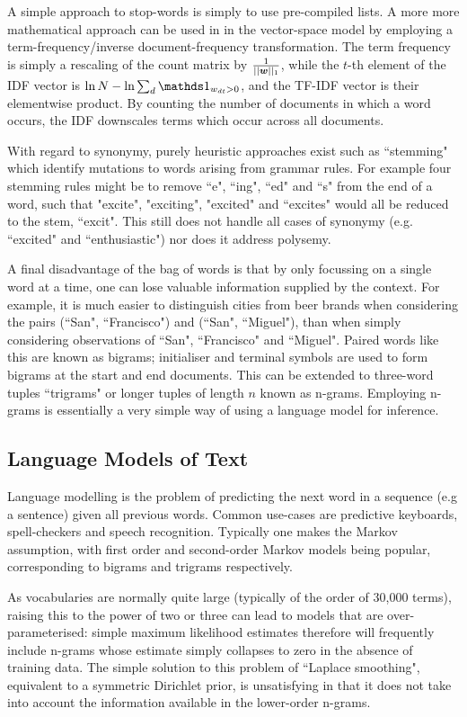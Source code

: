 A simple approach to stop-words is simply to use pre-compiled lists. A more more mathematical approach can be used in in the vector-space model by employing a term-frequency/inverse document-frequency transformation. The term frequency is simply a rescaling of the count matrix by $\frac{1}{||\bm w||_1}$, while the $t$-th element of the IDF vector is $\ln N - \ln \sum_d \one_{w_{dt} > 0}$, and the TF-IDF vector is their elementwise product. By counting the number of documents in which a word occurs, the IDF downscales terms which occur across all documents. 

With regard to synonymy, purely heuristic approaches exist such as ``stemming" which identify mutations to words arising from grammar rules. For example four stemming rules might be to remove ``e", ``ing", ``ed" and ``s" from the end of a word, such that "excite", "exciting", "excited" and ``excites" would all be reduced to the stem, ``excit". This still does not handle all cases of synonymy (e.g. ``excited" and ``enthusiastic") nor does it address polysemy.

A final disadvantage of the bag of words is that by only focussing on a single word at a time, one can lose valuable information supplied by the context. For example, it is much easier to distinguish cities from beer brands when considering the pairs (``San", ``Francisco") and (``San", ``Miguel"), than when simply considering observations of ``San", ``Francisco" and ``Miguel". Paired words like this are known as bigrams; initialiser and terminal symbols are used to form bigrams at the start and end documents. This can be extended to three-word tuples ``trigrams" or longer tuples of length $n$ known as n-grams. Employing n-grams is essentially a very simple way of using a language model for inference.


\subsection{Language Models of Text}
\label{sec:langmodels}
Language modelling is the problem of predicting the next word in a sequence (e.g a sentence) given all previous words. Common use-cases are predictive keyboards, spell-checkers and speech recognition. Typically one makes the Markov assumption, with first order and second-order Markov models being popular, corresponding to bigrams and trigrams respectively.

As vocabularies are normally quite large (typically of the order of 30,000 terms), raising this to the power of two or three can lead to models that are over-parameterised: simple maximum likelihood estimates therefore will frequently include n-grams whose estimate simply collapses to zero in the absence of training data. The simple solution to this problem  of ``Laplace smoothing", equivalent to a symmetric Dirichlet prior, is unsatisfying in that it does not take into account the information available in the lower-order n-grams.

